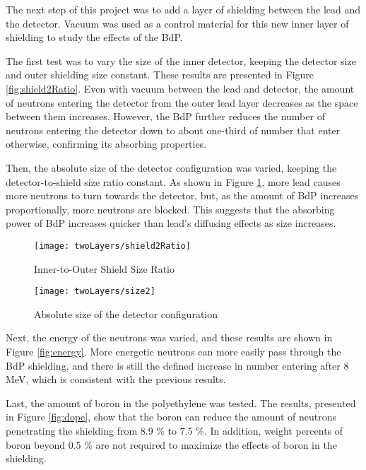 \documentclass[12pt]{article}
\begin{document}
The next step of this project was to add a layer of shielding between the lead and the detector. Vacuum was used as a control material for this new inner layer of shielding to study the effects of the BdP.

The first test was to vary the size of the inner detector, keeping the detector size and outer shielding size constant. These results are presented in Figure \ref{fig:shield2Ratio}. Even with vacuum between the lead and detector, the amount of neutrons entering the detector from the outer lead layer decreases as the space between them increases. However, the BdP further reduces the number of neutrons entering the detector down to about one-third of number that enter otherwise, confirming its absorbing properties.

Then, the absolute size of the detector configuration was varied, keeping the detector-to-shield size ratio constant. As shown in Figure \ref{fig:size2}, more lead causes more neutrons to turn towards the detector, but, as the amount of BdP increases proportionally, more neutrons are blocked. This suggests that the absorbing power of BdP increases quicker than lead’s diffusing effects as size increases.

\begin{figure}[H]
  \centering
  \begin{minipage}[t]{0.45\linewidth}
    \texttt{[image: twoLayers/shield2Ratio]}
    \caption{Inner-to-Outer Shield Size Ratio}
    \label{fig:shield2Ratio}
  \end{minipage}
  \quad
  \begin{minipage}[t]{0.45\linewidth}
    \texttt{[image: twoLayers/size2]}
    \caption{Absolute size of the detector configuration}
    \label{fig:size2}
  \end{minipage}
\end{figure}

Next, the energy of the neutrons was varied, and these results are shown in Figure \ref{fig:energy}. More energetic neutrons can more easily pass through the BdP shielding, and there is still the defined increase in number entering after 8 MeV, which is consistent with the previous results.

Last, the amount of boron in the polyethylene was tested. The results, presented in Figure \ref{fig:dope}, show that the boron can reduce the amount of neutrons penetrating the shielding from 8.9 \% to 7.5 \%. In addition, weight percents of boron beyond 0.5 \% are not required to maximize the effects of boron in the shielding.
\end{document}
